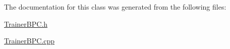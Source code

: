 The documentation for this class was generated from the following files\+:\begin{DoxyCompactItemize}
\item 
\hyperlink{TrainerBPC_8h}{Trainer\+B\+P\+C.\+h}\item 
\hyperlink{TrainerBPC_8cpp}{Trainer\+B\+P\+C.\+cpp}\end{DoxyCompactItemize}
